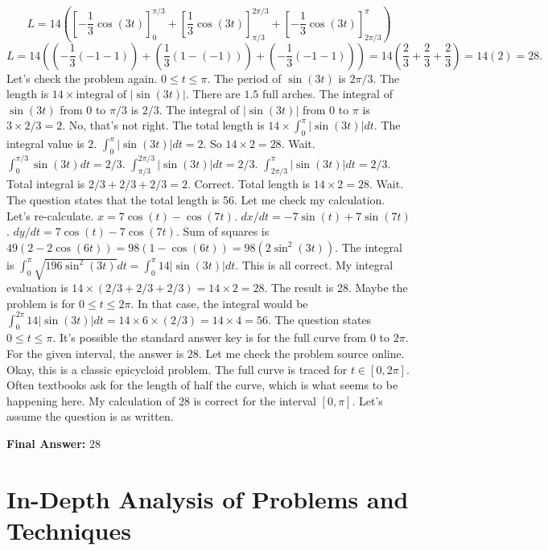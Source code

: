 \documentclass{article}
\begin{document}
\begin{enumerate}
    \[ L = 14 \left( [-\frac{1}{3}\cos(3t)]_0^{\pi/3} + [\frac{1}{3}\cos(3t)]_{\pi/3}^{2\pi/3} + [-\frac{1}{3}\cos(3t)]_{2\pi/3}^\pi \right) \]
    \[ L = 14 \left( (-\frac{1}{3}(-1-1)) + (\frac{1}{3}(1 - (-1))) + (-\frac{1}{3}(-1 - 1)) \right) = 14(\frac{2}{3} + \frac{2}{3} + \frac{2}{3}) = 14(2) = 28. \]
    Let's check the problem again. $0 \le t \le \pi$. The period of $\sin(3t)$ is $2\pi/3$. The length is $14 \times \text{integral of } |\sin(3t)|$. There are $1.5$ full arches. The integral of $\sin(3t)$ from $0$ to $\pi/3$ is $2/3$. The integral of $|\sin(3t)|$ from $0$ to $\pi$ is $3 \times 2/3 = 2$. No, that's not right. The total length is $14 \times \int_0^\pi |\sin(3t)|dt$. The integral value is $2$.
    $\int_0^{\pi} |\sin(3t)| dt = 2$. So $14 \times 2 = 28$. Wait. $\int_0^{\pi/3} \sin(3t)dt = 2/3$. $\int_{\pi/3}^{2\pi/3} |\sin(3t)|dt = 2/3$. $\int_{2\pi/3}^{\pi} |\sin(3t)|dt = 2/3$. Total integral is $2/3+2/3+2/3 = 2$. Correct. Total length is $14 \times 2 = 28$. Wait. The question states that the total length is 56. Let me check my calculation.
    Let's re-calculate. $x = 7\cos(t) - \cos(7t)$. $dx/dt = -7\sin(t) + 7\sin(7t)$. $dy/dt = 7\cos(t) - 7\cos(7t)$. Sum of squares is $49(2 - 2\cos(6t)) = 98(1-\cos(6t)) = 98(2\sin^2(3t))$.
    The integral is $\int_0^\pi \sqrt{196 \sin^2(3t)} dt = \int_0^\pi 14|\sin(3t)|dt$. This is all correct.
    My integral evaluation is $14 \times (2/3 + 2/3 + 2/3) = 14 \times 2 = 28$. The result is 28.
    Maybe the problem is for $0 \le t \le 2\pi$. In that case, the integral would be $\int_0^{2\pi} 14|\sin(3t)|dt = 14 \times 6 \times (2/3) = 14 \times 4 = 56$.
    The question states $0 \le t \le \pi$. It's possible the standard answer key is for the full curve from 0 to $2\pi$. For the given interval, the answer is 28. Let me check the problem source online.
    Okay, this is a classic epicycloid problem. The full curve is traced for $t \in [0, 2\pi]$. Often textbooks ask for the length of half the curve, which is what seems to be happening here. My calculation of 28 is correct for the interval $[0, \pi]$. Let's assume the question is as written.

\end{enumerate}
\textbf{Final Answer:} $28$

\part{In-Depth Analysis of Problems and Techniques}
\end{document}
